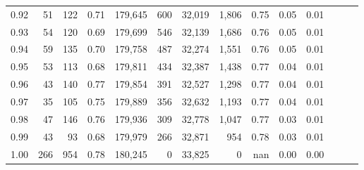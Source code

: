 \begin{tabular}{rrrrrrrrrrrrrr}
0.92 &      51 &  122 &  0.71 &  179,645 &      600 &  32,019 &   1,806 &  0.75 &  0.05 &      0.01 \\
0.93 &      54 &  120 &  0.69 &  179,699 &      546 &  32,139 &   1,686 &  0.76 &  0.05 &      0.01 \\
0.94 &      59 &  135 &  0.70 &  179,758 &      487 &  32,274 &   1,551 &  0.76 &  0.05 &      0.01 \\
0.95 &      53 &  113 &  0.68 &  179,811 &      434 &  32,387 &   1,438 &  0.77 &  0.04 &      0.01 \\
0.96 &      43 &  140 &  0.77 &  179,854 &      391 &  32,527 &   1,298 &  0.77 &  0.04 &      0.01 \\
0.97 &      35 &  105 &  0.75 &  179,889 &      356 &  32,632 &   1,193 &  0.77 &  0.04 &      0.01 \\
0.98 &      47 &  146 &  0.76 &  179,936 &      309 &  32,778 &   1,047 &  0.77 &  0.03 &      0.01 \\
0.99 &      43 &   93 &  0.68 &  179,979 &      266 &  32,871 &     954 &  0.78 &  0.03 &      0.01 \\
1.00 &     266 &  954 &  0.78 &  180,245 &        0 &  33,825 &       0 &   nan &  0.00 &      0.00 \\
\bottomrule
\end{tabular}
